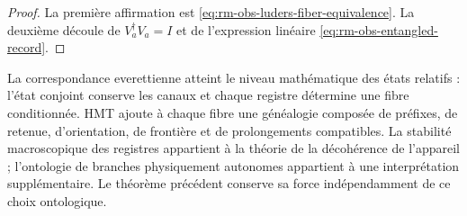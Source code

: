 \begin{proof}
La première affirmation est
\cref{eq:rm-obs-luders-fiber-equivalence}. La deuxième découle de
\(V_a^\dagger V_a=I\) et de l'expression linéaire
\cref{eq:rm-obs-entangled-record}.
\end{proof}

La correspondance everettienne atteint le niveau mathématique des états
relatifs : l'état conjoint conserve les canaux et chaque registre détermine
une fibre conditionnée. HMT ajoute à chaque fibre une généalogie composée
de préfixes, de retenue, d'orientation, de frontière et de prolongements compatibles.
La stabilité macroscopique des registres appartient à la théorie de
la décohérence de l'appareil ; l'ontologie de branches physiquement autonomes
appartient à une interprétation supplémentaire. Le théorème précédent conserve sa
force indépendamment de ce choix ontologique.

